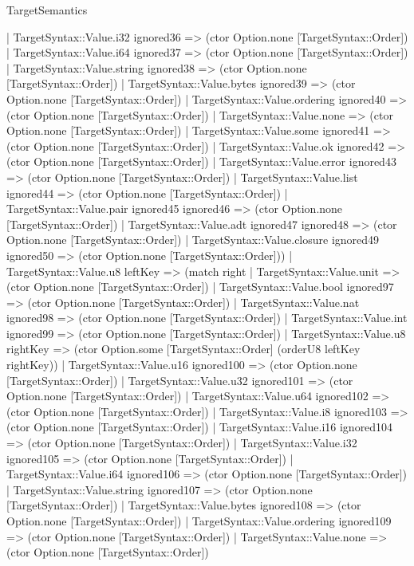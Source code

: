 \begin{lexlean}{TargetSemantics}
\begin{semanticmodule}
{      | TargetSyntax::Value.i32 ignored36 => (ctor Option.none [TargetSyntax::Order])
      | TargetSyntax::Value.i64 ignored37 => (ctor Option.none [TargetSyntax::Order])
      | TargetSyntax::Value.string ignored38 => (ctor Option.none [TargetSyntax::Order])
      | TargetSyntax::Value.bytes ignored39 => (ctor Option.none [TargetSyntax::Order])
      | TargetSyntax::Value.ordering ignored40 => (ctor Option.none [TargetSyntax::Order])
      | TargetSyntax::Value.none => (ctor Option.none [TargetSyntax::Order])
      | TargetSyntax::Value.some ignored41 => (ctor Option.none [TargetSyntax::Order])
      | TargetSyntax::Value.ok ignored42 => (ctor Option.none [TargetSyntax::Order])
      | TargetSyntax::Value.error ignored43 => (ctor Option.none [TargetSyntax::Order])
      | TargetSyntax::Value.list ignored44 => (ctor Option.none [TargetSyntax::Order])
      | TargetSyntax::Value.pair ignored45 ignored46 => (ctor Option.none [TargetSyntax::Order])
      | TargetSyntax::Value.adt ignored47 ignored48 => (ctor Option.none [TargetSyntax::Order])
      | TargetSyntax::Value.closure ignored49 ignored50 => (ctor Option.none [TargetSyntax::Order]))
    | TargetSyntax::Value.u8 leftKey => (match right
      | TargetSyntax::Value.unit => (ctor Option.none [TargetSyntax::Order])
      | TargetSyntax::Value.bool ignored97 => (ctor Option.none [TargetSyntax::Order])
      | TargetSyntax::Value.nat ignored98 => (ctor Option.none [TargetSyntax::Order])
      | TargetSyntax::Value.int ignored99 => (ctor Option.none [TargetSyntax::Order])
      | TargetSyntax::Value.u8 rightKey => (ctor Option.some [TargetSyntax::Order] (orderU8 leftKey rightKey))
      | TargetSyntax::Value.u16 ignored100 => (ctor Option.none [TargetSyntax::Order])
      | TargetSyntax::Value.u32 ignored101 => (ctor Option.none [TargetSyntax::Order])
      | TargetSyntax::Value.u64 ignored102 => (ctor Option.none [TargetSyntax::Order])
      | TargetSyntax::Value.i8 ignored103 => (ctor Option.none [TargetSyntax::Order])
      | TargetSyntax::Value.i16 ignored104 => (ctor Option.none [TargetSyntax::Order])
      | TargetSyntax::Value.i32 ignored105 => (ctor Option.none [TargetSyntax::Order])
      | TargetSyntax::Value.i64 ignored106 => (ctor Option.none [TargetSyntax::Order])
      | TargetSyntax::Value.string ignored107 => (ctor Option.none [TargetSyntax::Order])
      | TargetSyntax::Value.bytes ignored108 => (ctor Option.none [TargetSyntax::Order])
      | TargetSyntax::Value.ordering ignored109 => (ctor Option.none [TargetSyntax::Order])
      | TargetSyntax::Value.none => (ctor Option.none [TargetSyntax::Order])
}
\end{semanticmodule}
\end{lexlean}
